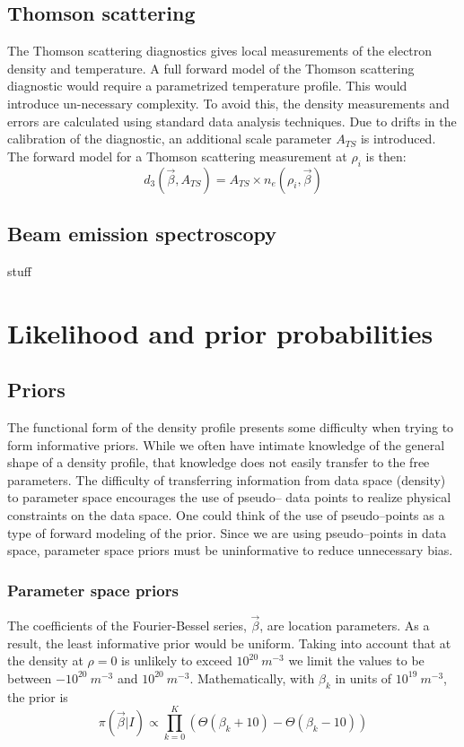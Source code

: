 \documentclass[12pt]{article}
\numberwithin{equation}{section}
\begin{document}
\subsection{Thomson scattering}
The Thomson scattering diagnostics gives local measurements of the electron density and temperature. A full forward model of the Thomson scattering diagnostic would require a parametrized temperature profile. This would introduce un-necessary complexity. To avoid this, the density measurements and errors are calculated using standard data analysis techniques. Due to drifts in the calibration of the diagnostic, an additional scale parameter $A_{TS}$ is introduced. The forward model for a Thomson scattering measurement at $\rho_i$ is then:
\begin{equation} \label{eq:thom_model}
	d_3(\vec{\beta},A_{TS}) = A_{TS} \times n_{e}(\rho_i,\vec{\beta})
\end{equation}
\subsection{Beam emission spectroscopy}
stuff
\section{Likelihood and prior probabilities}
\subsection{Priors}
The functional form of the density profile presents some difficulty when 
trying to form informative priors. While we often have intimate knowledge of 
the general shape of a density profile, that knowledge does not easily 
transfer to the free parameters. The difficulty of transferring information 
from data space (density) to parameter space encourages the use of pseudo--
data points to realize physical constraints on the data space. One could 
think of the use of pseudo--points as a type of forward modeling of the 
prior. Since we are using pseudo--points in data space, parameter space 
priors must be uninformative to reduce unnecessary bias. 
\subsubsection{Parameter space priors}
The coefficients of the Fourier-Bessel series, $\vec{\beta}$, are location 
parameters. As a result, the least informative prior would be uniform. Taking 
into account that at the density at $\rho = 0$ is unlikely to exceed $10^{20} 
\: m^{-3}$ we limit the values to be between $-10^{20} \: m^{-3}$ and $10^
{20} \: m^{-3}$. Mathematically, with $\beta_k$ in units of $10^{19}\: m^{-3}$, the prior is
\begin{equation} \label{eq:coeffpriors}
	\pi(\vec{\beta}|I) \propto \prod \limits_{k=0}^{K} (\Theta(\beta_k + 10) 		- \Theta(\beta_k - 10))
\end{equation}
\end{document}

